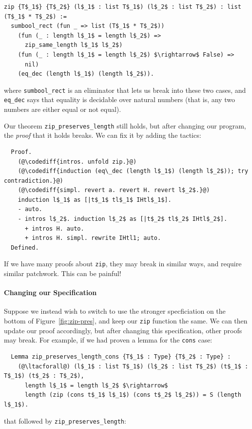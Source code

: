 \begin{lstlisting}
zip {T$_1$} {T$_2$} (l$_1$ : list T$_1$) (l$_2$ : list T$_2$) : list (T$_1$ * T$_2$) :=
  sumbool_rect (fun _ => list (T$_1$ * T$_2$))
    (fun (_ : length l$_1$ = length l$_2$) =>
      zip_same_length l$_1$ l$_2$)
    (fun (_ : length l$_1$ = length l$_2$) $\rightarrow$ False) =>
      nil)
    (eq_dec (length l$_1$) (length l$_2$)).
\end{lstlisting}
where \lstinline{sumbool_rect} is an eliminator that lets us break into these two cases, and 
\lstinline{eq_dec} says that equality is decidable over natural numbers (that is, any two numbers are either equal or not equal).


Our theorem \lstinline{zip_preserves_length} still holds, but after changing our program, the \textit{proof} that it holds breaks.
We can fix it by adding the  tactics:

\begin{lstlisting}
  Proof.
    (@\codediff{intros. unfold zip.}@)
    (@\codediff{induction (eq\_dec (length l$_1$) (length l$_2$)); try contradiction.}@)
    (@\codediff{simpl. revert a. revert H. revert l$_2$.}@)
    induction l$_1$ as [|t$_1$ tl$_1$ IHtl$_1$].
    - auto.
    - intros l$_2$. induction l$_2$ as [|t$_2$ tl$_2$ IHtl$_2$].
      + intros H. auto.
      + intros H. simpl. rewrite IHtl1; auto.
  Defined.
\end{lstlisting}
If we have many proofs about \lstinline{zip}, they may break in similar ways, and require similar patchwork.
This can be painful!

\paragraph{Changing our Specification}
Suppose we instead wish to switch to use the stronger specficiation on the bottom of Figure~\ref{fig:zip-pres},
and keep our \lstinline{zip} function the same.
We can then update our proof accordingly, but after changing this specification, other proofs may break.
For example, if we had proven a lemma for the \lstinline{cons} case:

\begin{lstlisting}
  Lemma zip_preserves_length_cons {T$_1$ : Type} {T$_2$ : Type} :
    (@\ltacforall@) (l$_1$ : list T$_1$) (l$_2$ : list T$_2$) (t$_1$ : T$_1$) (t$_2$ : T$_2$),
      length l$_1$ = length l$_2$ $\rightarrow$
      length (zip (cons t$_1$ l$_1$) (cons t$_2$ l$_2$)) = S (length l$_1$).
\end{lstlisting}
that followed by \lstinline{zip_preserves_length}:

